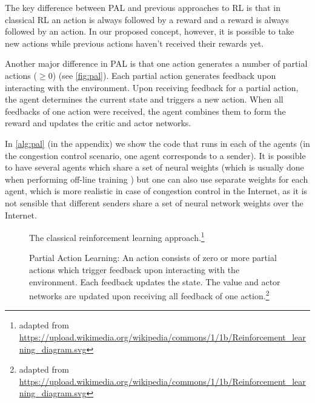 \documentclass[sigconf]{acmart}
\begin{document}
The key difference between PAL and previous approaches to RL is that in classical RL an action is always followed by a reward and a reward is always followed by an action. In our proposed concept, however, it is possible to take new actions while previous actions haven't received their rewards yet.

Another major difference in PAL is that one action generates a number of partial actions ($\geq 0$) (see \autoref{fig:pal}). Each partial action generates feedback upon interacting with the environment. Upon receiving feedback for a partial action, the agent determines the current state and triggers a new action. When all feedbacks of one action were received, the agent combines them to form the reward and updates the critic and actor networks.

In \autoref{alg:pal} (in the appendix) we show the code that runs in each of the agents (in the congestion control scenario, one agent corresponds to a sender). It is possible to have several agents which share a set of neural weights (which is usually done when performing off-line training \cite{mnih_asynchronous_2016,mao_neural_2017}) but one can also use separate weights for each agent, which is more realistic in case of congestion control in the Internet, as it is not sensible that different senders share a set of neural network weights over the Internet.

\begin{figure}
\begin{minipage}{\columnwidth}

\caption{The classical reinforcement learning approach.\protect\footnote{adapted from \url{https://upload.wikimedia.org/wikipedia/commons/1/1b/Reinforcement_learning_diagram.svg}}}
\label{fig:reinforcement}
\end{minipage}
\end{figure}

\begin{figure}
\begin{minipage}{\columnwidth}

\caption{Partial Action Learning: An action consists of zero or more partial actions which trigger feedback upon interacting with the environment. Each feedback updates the state. The value and actor networks are updated upon receiving all feedback of one action.\protect\footnote{adapted from \url{https://upload.wikimedia.org/wikipedia/commons/1/1b/Reinforcement_learning_diagram.svg}}}
\label{fig:pal}
\end{minipage}
\end{figure}
\end{document}
